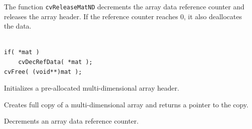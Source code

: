 The function \texttt{cvReleaseMatND} decrements the array data reference counter and releases the array header. If the reference counter reaches 0, it also deallocates the data.

\begin{lstlisting}

if( *mat )
    cvDecRefData( *mat );
cvFree( (void**)mat );

\end{lstlisting}

\label{InitMatNDHeader}

Initializes a pre-allocated multi-dimensional array header.


\begin{description}
\end{description}

\label{CloneMatND}

Creates full copy of a multi-dimensional array and returns a pointer to the copy.


\begin{description}
\end{description}


\label{DecRefData}

Decrements an array data reference counter.


\begin{description}
\end{description}

